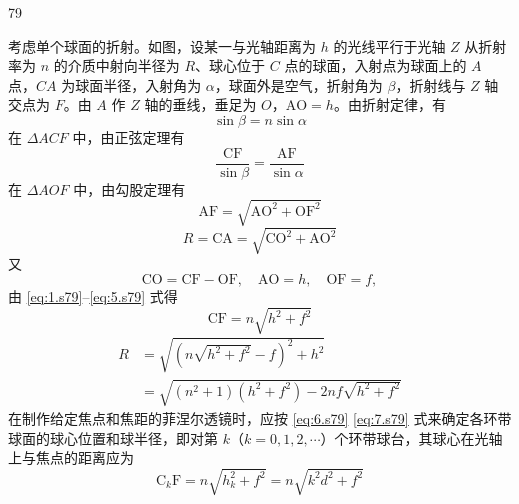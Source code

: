 \begin{solution}{79}
    \begin{subsolution}
        考虑单个球面的折射。如图，设某一与光轴距离为 $h$ 的光线平行于光轴 $Z$ 从折射率为 $n$ 的介质中射向半径为 $R$、球心位于 $C$ 点的球面，入射点为球面上的 $A$ 点，$CA$ 为球面半径，入射角为 $\alpha$，球面外是空气，折射角为 $\beta$，折射线与 $Z$ 轴交点为 $F$。由 $A$ 作 $Z$ 轴的垂线，垂足为 $O$，$\mathrm{AO} = h$。由折射定律，有
        \begin{equation}
            \sin \beta = n \sin \alpha
            \label{eq:1.s79}
        \end{equation}
        在 $\Delta ACF$ 中，由正弦定理有
        \begin{equation}
            \frac{\mathrm{CF}}{\sin \beta} = \frac{\mathrm{AF}}{\sin \alpha}
            \label{eq:2.s79}
        \end{equation}
        在 $\Delta AOF$ 中，由勾股定理有
        \begin{equation}
            \mathrm{AF} = \sqrt{\mathrm{AO}^{2} + \mathrm{OF}^{2}}
            \label{eq:3.s79}
        \end{equation}
        \begin{equation}
            R = \mathrm{CA} = \sqrt{\mathrm{CO}^{2} + \mathrm{AO}^{2}}
            \label{eq:4.s79}
        \end{equation}
        又
        \begin{equation}
            \mathrm{CO} = \mathrm{CF} - \mathrm{OF},\quad \mathrm{AO} = h,\quad \mathrm{OF} = f,
            \label{eq:5.s79}
        \end{equation}
        由 \eqref{eq:1.s79}--\eqref{eq:5.s79} 式得
        \begin{equation}
            \mathrm{CF} = n \sqrt{h^{2} + f^{2}}
            \label{eq:6.s79}
        \end{equation}
        \begin{align}
            R &= \sqrt{(n \sqrt{h^{2} + f^{2}} - f)^{2} + h^{2}} \nonumber \\
            &= \sqrt{(n^{2} + 1)(h^{2} + f^{2}) - 2 n f \sqrt{h^{2} + f^{2}}}
            \label{eq:7.s79}
        \end{align}
        在制作给定焦点和焦距的菲涅尔透镜时，应按 \eqref{eq:6.s79} \eqref{eq:7.s79} 式来确定各环带球面的球心位置和球半径，即对第 $k$（$k=0,1,2,\cdots$）个环带球台，其球心在光轴上与焦点的距离应为
        \begin{equation}
            \mathrm{C}_{k} \mathrm{F} = n \sqrt{h_{k}^{2} + f^{2}} = n \sqrt{k^{2} d^{2} + f^{2}}

\end{equation}
\end{subsolution}
\end{solution}
